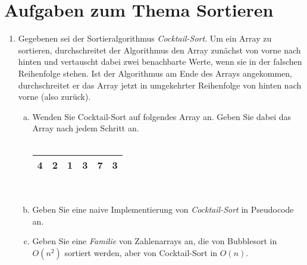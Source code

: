 \documentclass{scrartcl}
\begin{document}
\section*{Aufgaben zum Thema Sortieren}
\begin{enumerate}[(1)]

\item Gegebenen sei der Sortieralgorithmus \emph{Cocktail-Sort}. Um ein Array zu sortieren, durchschreitet der Algorithmus den Array zun\"achst von vorne nach hinten und vertauscht dabei zwei benachbarte Werte, wenn sie in der falschen Reihenfolge stehen. Ist der Algorithmus am Ende des Arrays angekommen, durchschreitet er das Array jetzt in umgekehrter Reihenfolge von hinten nach vorne (also \glqq zur\"uck\grqq).
\begin{enumerate}[(a)]
\item Wenden Sie Cocktail-Sort auf folgendes Array an. Geben Sie dabei das Array nach jedem Schritt an. \\
\\
\begin{center}
\begin{tabular}{|c|c|c|c|c|c|}
\hline
4 & 2 & 1 & 3 & 7 & 3 \\
\hline
\end{tabular}
\end{center}
\text{ } \\
\item Geben Sie eine naive Implementierung von \emph{Cocktail-Sort} in Pseudocode an.
\item Geben Sie eine \emph{Familie} von Zahlenarrays an, die von Bubblesort in $O(n^2)$ sortiert werden, aber von Cocktail-Sort in $O(n)$.
\end{enumerate}

\end{enumerate}
\end{document}
